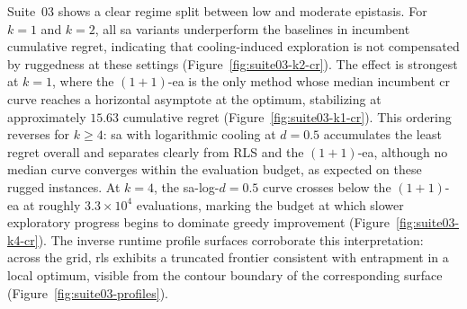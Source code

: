 Suite~03 shows a clear regime split between low and moderate
epistasis. For $k=1$ and $k=2$, all \acrshort{sa} variants underperform the
baselines in incumbent cumulative regret, indicating that
cooling-induced exploration is not compensated by ruggedness at these
settings (Figure~\ref{fig:suite03-k2-cr}). The effect is strongest at
$k=1$, where the $(1+1)$-\acrshort{ea} is
the only method whose median incumbent \acrshort{cr} curve
reaches a horizontal asymptote at the optimum, stabilizing at
approximately $15.63$ cumulative regret (Figure~\ref{fig:suite03-k1-cr}).
This ordering reverses for $k \ge 4$: \acrshort{sa} with
logarithmic cooling at $d=0.5$ accumulates the least regret overall
and separates clearly from RLS and the $(1+1)$-\acrshort{ea}, although no median
curve converges within the evaluation budget, as expected on these
rugged instances. At $k=4$, the \acrshort{sa}-\acrshort{log}-$d=0.5$
curve crosses below
the $(1+1)$-\acrshort{ea} at roughly $3.3\times 10^4$ evaluations, marking the
budget at which slower exploratory progress begins to dominate greedy
improvement (Figure~\ref{fig:suite03-k4-cr}). The inverse runtime profile
surfaces corroborate
this interpretation: across the grid, \acrshort{rls} exhibits a truncated
frontier consistent with entrapment in a local optimum, visible from
the contour boundary of the corresponding surface
(Figure~\ref{fig:suite03-profiles}).
%
